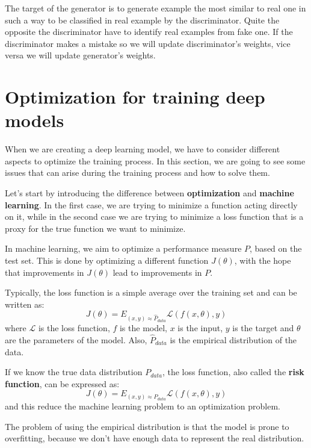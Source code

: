The target of the generator is to generate example the most similar to real one
in such a way to be classified in real example by the discriminator. Quite the
opposite the discriminator have to identify real examples from fake one. If the
discriminator makes a mistake so we will update discriminator's weights, vice
versa we will update generator's weights.
\section{Optimization for training deep models}
When we are creating a deep learning model, we have to consider different aspects
to optimize the training process. In this section, we are going to see some
issues that can arise during the training process and how to solve them.

Let's start by introducing the difference between \textbf{optimization} and
\textbf{machine learning}. In the first case, we are trying to minimize a function
acting directly on it, while in the second case we are trying to minimize a loss
function that is a proxy for the true function we want to minimize.

In machine learning, we aim to optimize a performance measure $P$, based on the
test set. This is done by optimizing a different function $J(\theta)$, with the
hope that improvements in $J(\theta)$ lead to improvements in $P$.

Typically, the loss function is a simple average over the training set and can be
written as:
\begin{equation}
    J(\theta) = E_{(x, y) \approx \hat{P}_{data}} \mathcal{L}(f(x, \theta), y)
\end{equation}
where $\mathcal{L}$ is the loss function, $f$ is the model, $x$ is the input, $y$
is the target and $\theta$ are the parameters of the model. Also, $\hat{P}_{data}$ is
the empirical distribution of the data.

If we know the true data distribution $P_{data}$, the loss function, also called
the \textbf{risk function}, can be expressed as:
\begin{equation}
    J(\theta) = E_{(x, y) \approx P_{data}} \mathcal{L}(f(x, \theta), y)
\end{equation}
and this reduce the machine learning problem to an optimization problem.

The problem of using the empirical distribution is that the model is prone to
overfitting, because we don't have enough data to represent the real distribution.

